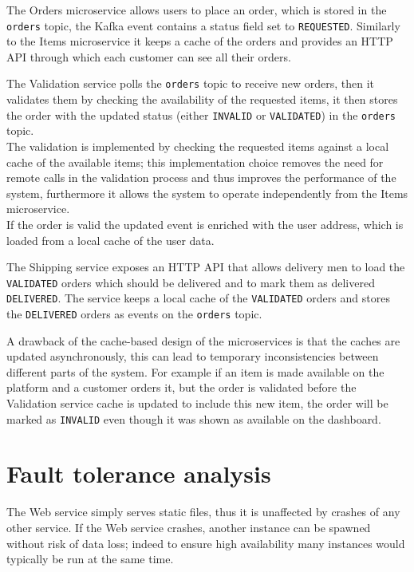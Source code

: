 \documentclass{article}
\begin{document}
The Orders microservice allows users to place an order, which is stored in the \texttt{orders} topic, the Kafka event contains a status field set to \texttt{REQUESTED}. Similarly to the Items microservice it keeps a cache of the orders and provides an HTTP API through which each customer can see all their orders.

The Validation service polls the \texttt{orders} topic to receive new orders, then it validates them by checking the availability of the requested items, it then stores the order with the updated status (either \texttt{INVALID} or \texttt{VALIDATED}) in the \texttt{orders} topic.\\
The validation is implemented by checking the requested items against a local cache of the available items; this implementation choice removes the need for remote calls in the validation process and thus improves the performance of the system, furthermore it allows the system to operate independently from the Items microservice.\\
If the order is valid the updated event is enriched with the user address, which is loaded from a local cache of the user data.

The Shipping service exposes an HTTP API that allows delivery men to load the \texttt{VALIDATED} orders which should be delivered and to mark them as delivered \texttt{DELIVERED}. The service keeps a local cache of the \texttt{VALIDATED} orders and stores the \texttt{DELIVERED} orders as events on the \texttt{orders} topic.

A drawback of the cache-based design of the microservices is that the caches are updated asynchronously, this can lead to temporary inconsistencies between different parts of the system. For example if an item is made available on the platform and a customer orders it, but the order is validated before the Validation service cache is updated to include this new item, the order will be marked as \texttt{INVALID} even though it was shown as available on the dashboard.

\section{Fault tolerance analysis}
The Web service simply serves static files, thus it is unaffected by crashes of any other service. If the Web service crashes, another instance can be spawned without risk of data loss; indeed to ensure high availability many instances would typically be run at the same time.
\end{document}

